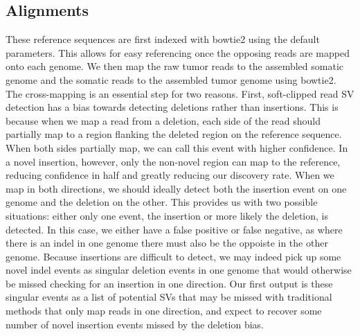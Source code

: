 \documentclass{easychithesis}
\begin{document}
\subsection{Alignments}
These reference sequences are first indexed with bowtie2 \cite{langmead2012fast} using the default parameters. This allows for easy referencing once the opposing reads are mapped onto each genome. We then map the raw tumor reads to the assembled somatic genome and the somatic reads to the assembled tumor genome using bowtie2. The cross-mapping is an essential step for two reasons. First, soft-clipped read SV detection has a bias towards detecting deletions rather than insertions. This is because when we map a read from a deletion, each side of the read should partially map to a region flanking the deleted region on the reference sequence. When both sides partially map, we can call this event with higher confidence. In a novel insertion, however, only the non-novel region can map to the reference, reducing confidence in half and greatly reducing our discovery rate. When we map in both directions, we should ideally detect both the insertion event on one genome and the deletion on the other. This provides us with two possible situations: either only one event, the insertion or more likely the deletion, is detected. In this case, we either have a false positive or false negative, as where there is an indel in one genome there must also be the oppoiste in the other genome. Because insertions are difficult to detect, we may indeed pick up some novel indel events as singular deletion events in one genome that would otherwise be missed checking for an insertion in one direction. Our first output is these singular events as a list of potential SVs that may be missed with traditional methods that only map reads in one direction, and expect to recover some number of novel insertion events missed by the deletion bias.
\end{document}
